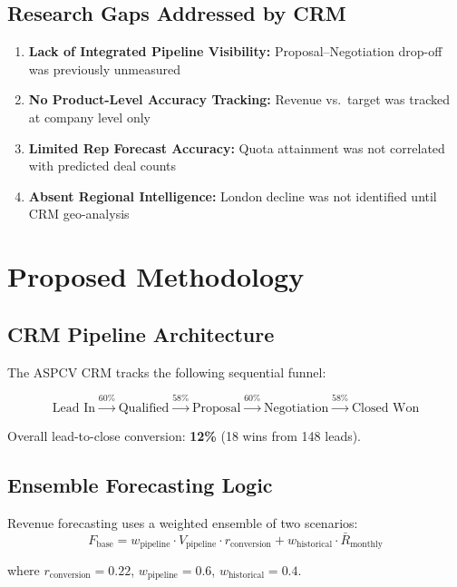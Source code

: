 \documentclass[12pt,a4paper]{report}
\begin{document}
\section{Research Gaps Addressed by CRM}

\begin{enumerate}[noitemsep]
  \item \textbf{Lack of Integrated Pipeline Visibility:} Proposal--Negotiation drop-off was previously unmeasured
  \item \textbf{No Product-Level Accuracy Tracking:} Revenue vs.\ target was tracked at company level only
  \item \textbf{Limited Rep Forecast Accuracy:} Quota attainment was not correlated with predicted deal counts
  \item \textbf{Absent Regional Intelligence:} London decline was not identified until CRM geo-analysis
\end{enumerate}

\chapter{Proposed Methodology}

\section{CRM Pipeline Architecture}

The ASPCV CRM tracks the following sequential funnel:

\[
\text{Lead In} \xrightarrow{60\%} \text{Qualified} \xrightarrow{58\%} \text{Proposal} \xrightarrow{60\%} \text{Negotiation} \xrightarrow{58\%} \text{Closed Won}
\]

Overall lead-to-close conversion: \textbf{12\%} (18 wins from 148 leads).

\section{Ensemble Forecasting Logic}

Revenue forecasting uses a weighted ensemble of two scenarios:
\[
F_{\text{base}} = w_{\text{pipeline}} \cdot V_{\text{pipeline}} \cdot r_{\text{conversion}} + w_{\text{historical}} \cdot \bar{R}_{\text{monthly}}
\]

where $r_{\text{conversion}} = 0.22$, $w_{\text{pipeline}} = 0.6$, $w_{\text{historical}} = 0.4$.
\end{document}
